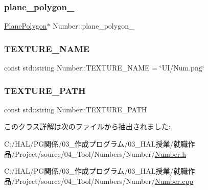 \mbox{\label{class_number_a588084d69c46b02ddb608448724cfe11}} 
\subsubsection{\texorpdfstring{plane\+\_\+polygon\+\_\+}{plane\_polygon\_}}
{\footnotesize\ttfamily \mbox{\hyperlink{class_plane_polygon}{Plane\+Polygon}}$\ast$ Number\+::plane\+\_\+polygon\+\_\+}

\mbox{\label{class_number_a43c6583cef6d8d32b8de6683f80bdb59}} 
\subsubsection{\texorpdfstring{T\+E\+X\+T\+U\+R\+E\+\_\+\+N\+A\+ME}{TEXTURE\_NAME}}
{\footnotesize\ttfamily const std\+::string Number\+::\+T\+E\+X\+T\+U\+R\+E\+\_\+\+N\+A\+ME = \char`\"{}UI/Num.\+png\char`\"{}\hspace{0.3cm}{\ttfamily [static]}}

\mbox{\label{class_number_a0018ed63d70f4dde3c64bf99df7978ce}} 
\subsubsection{\texorpdfstring{T\+E\+X\+T\+U\+R\+E\+\_\+\+P\+A\+TH}{TEXTURE\_PATH}}
{\footnotesize\ttfamily const std\+::string Number\+::\+T\+E\+X\+T\+U\+R\+E\+\_\+\+P\+A\+TH\hspace{0.3cm}{\ttfamily [static]}}



このクラス詳解は次のファイルから抽出されました\+:\begin{DoxyCompactItemize}
\item 
C\+:/\+H\+A\+L/\+P\+G関係/03\+\_\+作成プログラム/03\+\_\+\+H\+A\+L授業/就職作品/\+Project/source/04\+\_\+\+Tool/\+Numbers/\+Number/\mbox{\hyperlink{_number_8h}{Number.\+h}}\item 
C\+:/\+H\+A\+L/\+P\+G関係/03\+\_\+作成プログラム/03\+\_\+\+H\+A\+L授業/就職作品/\+Project/source/04\+\_\+\+Tool/\+Numbers/\+Number/\mbox{\hyperlink{_number_8cpp}{Number.\+cpp}}\end{DoxyCompactItemize}
